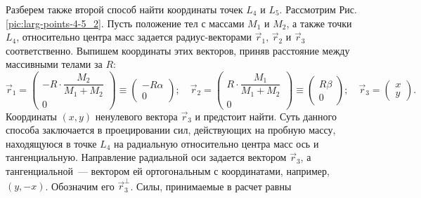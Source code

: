 Разберем также второй способ найти координаты точек $L_{4}$ и $L_5$. Рассмотрим Рис.\,\ref{pic:larg-points-4-5_2}. Пусть положение тел с массами $M_1$ и $M_2$, а также точки $L_4$, относительно центра масс задается радиус-векторами $\vec{r}_1$, $\vec{r}_2$ и $\vec{r}_3$ соответственно. Выпишем координаты этих векторов, приняв расстояние между массивными телами за $R$:
\begin{equation*}
    \vec{r}_1
        = \begin{pmatrix}
            -R \cdot \dfrac{M_2}{M_1 + M_2}\\[.5pc]
            0
        \end{pmatrix}
    \equiv \begin{pmatrix}
        -R \alpha \\
        0
    \end{pmatrix}; \quad
    \vec{r}_2
        = \begin{pmatrix}
            R \cdot \dfrac{M_1}{M_1 + M_2}\\[.5pc]
            0
        \end{pmatrix}
    \equiv \begin{pmatrix}
        R \beta \\
        0
    \end{pmatrix}; \quad
    \vec{r}_3
        = \begin{pmatrix}
            x \\
            y
        \end{pmatrix}.
\end{equation*}
Координаты $(x, y)$ ненулевого вектора $\vec{r}_3$  и предстоит найти. Суть данного способа заключается в проецировании сил, действующих на пробную массу, находящуюся в точке $L_4$ на радиальную относительно центра масс ось и тангенциальную. Направление радиальной оси задается вектором $\vec{r}_3$, а тангенциальной~---  вектором ей ортогональным с координатами, например, $(y, -x)$. Обозначим его $\vec{r}_3^\perp$. Силы, принимаемые в расчет равны
